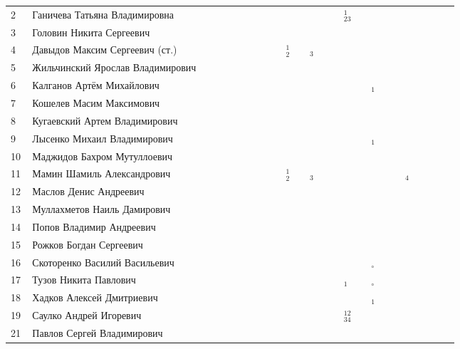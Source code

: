 \documentclass[a4paper,landscape,11pt]{article}
\newcommand*\OK{&\small \ding{51}$\!\!_\circ$} %
\newcommand*\ok{&{\small \ding{51}}} %
\newcommand*\no{&{\small }} %
\newcommand*\da{&{\small\ding{48}$\!\!_1$}} %
\newcommand*\dab{&{\small\ding{48}$\!\!^1_2$}} %
\newcommand*\dabc{&{\small\ding{48}$\!\!^1_{23}$}} %
\newcommand*\dabcd{&{\small\ding{48}$\!\!^{12}_{34}$}} %
\newcommand*\dc{&{\small\ding{48}$\!\!_3$}} %
\newcommand*\dd{&{\small\ding{48}$\!\!_4$}} %
\begin{document}
\begin{tabular}{p{7pt}|l|p{6pt}p{6pt}p{6pt}p{6pt}p{6pt}p{6pt}p{6pt}p{6pt}p{6pt}p{6pt}p{6pt}p{6pt}p{6pt}p{6pt}p{6pt}p{6pt}p{6pt}p{6pt}p{6pt}p{6pt}p{6pt}p{6pt}p{6pt}}
 2\,&Ганичева Татьяна Владимировна   \,\ok\no\ok\ok\ok\no\ok\ok\ok \ok\ok\ok\ok\dabc \ok\no\ok\no\ok\no\no\no\\
 3\,&Головин Никита Сергеевич          \ok\no\no\ok\no\no\no\ok\ok \ok   \\
 4\,&Давыдов Максим Сергеевич (ст.)    \ok\ok\ok\ok\ok\ok\ok\ok\dab\ok\dc\ok\ok\ok   \ok\ok\ok\ok\ok\ok\no\ok\\
 5\,&Жильчинский Ярослав Владимирович  \ok\ok\ok\ok\ok\ok\ok\ok\ok \ok\ok\ok\ok\no   \no\ok\ok\ok\ok\ok\ok\ok\\
 6\,&Калганов Артём Михайлович         \ok\no\ok\ok\ok\no\ok\ok\ok \ok\ok\ok\ok\no   \ok\da\ok\ok\ok\ok\ok\ok\\
 7\,&Кошелев Масим Максимович          \no\no\no\no\no\no\no\no\no \ok   \\
 8\,&Кугаевский Артем Владимирович     \ok\no\no\ok\ok\no\no\ok\ok \ok\no\ok\no\no   \no\ok\no\no\no\ok\ok\no\\
 9\,&Лысенко Михаил Владимирович       \ok\ok\ok\ok\ok\ok\ok\ok\ok \ok\ok\ok\ok\ok   \ok\da\ok\ok\ok\ok\ok\ok\\
10\,&Маджидов Бахром Мутуллоевич       \\
11\,&Мамин Шамиль Александрович        \ok\no\no\ok\ok\no\ok\ok\dab\ok\dc\ok\ok\no   \ok\ok\ok\ok\dd\ok\ok\ok\\
\midrule
12\,&Маслов Денис Андреевич            \ok\ok\ok\ok\ok\no\no\ok\ok \ok\ok\ok\ok\no   \ok\no\no\no\no\\
13\,&Муллахметов Наиль Дамирович       \ok\ok\no\ok\no\no\ok\no\ok \ok\no\no\ok\no   \no\ok\no\no\no\\
14\,&Попов Владимир Андреевич          \ok\ok\no\ok\ok\ok\ok\ok\ok \ok \\
15\,&Рожков Богдан Сергеевич           \\
16\,&Скоторенко Василий Васильевич     \ok\ok\ok\ok\ok\ok\ok\ok\ok \ok\ok\ok\ok\no   \ok\OK\ok\no\ok\no\no\no\\
17\,&Тузов Никита Павлович             \ok\ok\ok\ok\ok\ok\ok\ok\ok \ok\ok\ok\ok\da   \ok\OK\ok\ok\ok\ok\ok\no\\
18\,&Хадков Алексей Дмитриевич         \ok\no\ok\ok\ok\ok\ok\ok\ok \ok\ok\ok\ok\ok   \ok\da\ok\ok\ok\ok\ok\ok\\
19\,&Саулко Андрей Игоревич            \ok\no\no\ok\ok\no\no\ok\ok \ok\ok\ok\ok\dabcd\ok\no\ok\ok\ok\ok\ok\ok\\
21\,&Павлов Сергей Владимирович        \ok\ok\no\ok\no\no\no\ok\no \no\ok\no\no\no\\   
\bottomrule
\end{tabular} 
\end{document}
